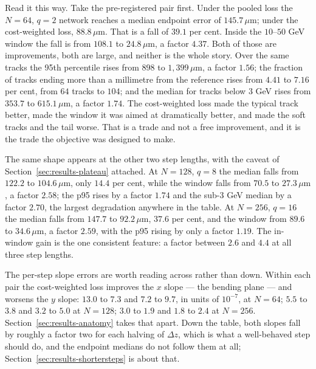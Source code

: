 \documentclass[11pt,a4paper]{article}
\newcommand{\um}{\ensuremath{\,\mu\mathrm{m}}}
\begin{document}
Read it this way. Take the pre-registered pair first. Under the pooled loss the
$N = 64$, $q = 2$ network reaches a median endpoint error of $145.7\um$; under
the cost-weighted loss, $88.8\um$. That is a fall of $39.1$ per cent. Inside the
$10$--$50$ GeV window the fall is from $108.1$ to $24.8\um$, a factor $4.37$.
Both of those are improvements, both are large, and neither is the whole story.
Over the same tracks the 95th percentile rises from $898$ to $1{,}399\um$, a
factor $1.56$; the fraction of tracks ending more than a millimetre from the
reference rises from $4.41$ to $7.16$ per cent, from $64$ tracks to $104$; and
the median for tracks below $3$ GeV rises from $353.7$ to $615.1\um$, a factor
$1.74$. The cost-weighted loss made the typical track better, made the window
it was aimed at dramatically better, and made the soft tracks and the tail
worse. That is a trade and not a free improvement, and it is the trade the
objective was designed to make.

The same shape appears at the other two step lengths, with the caveat of
Section~\ref{sec:results-plateau} attached. At $N = 128$, $q = 8$ the median
falls from $122.2$ to $104.6\um$, only $14.4$ per cent, while the window falls
from $70.5$ to $27.3\um$, a factor $2.58$; the p95 rises by a factor $1.74$ and
the sub-$3$ GeV median by a factor $2.70$, the largest degradation anywhere in
the table. At $N = 256$, $q = 16$ the median falls from $147.7$ to $92.2\um$,
$37.6$ per cent, and the window from $89.6$ to $34.6\um$, a factor $2.59$, with
the p95 rising by only a factor $1.19$. The in-window gain is the one consistent
feature: a factor between $2.6$ and $4.4$ at all three step lengths.

The per-step slope errors are worth reading across rather than down. Within each
pair the cost-weighted loss improves the $x$ slope --- the bending plane --- and
worsens the $y$ slope: $13.0$ to $7.3$ and $7.2$ to $9.7$, in units of
$10^{-7}$, at $N = 64$; $5.5$ to $3.8$ and $3.2$ to $5.0$ at $N = 128$;
$3.0$ to $1.9$ and $1.8$ to $2.4$ at $N = 256$. Section~\ref{sec:results-anatomy}
takes that apart. Down the table, both slopes fall by roughly a factor two for
each halving of $\Delta z$, which is what a well-behaved step should do, and the
endpoint medians do not follow them at all;
Section~\ref{sec:results-shortersteps} is about that.
\end{document}
